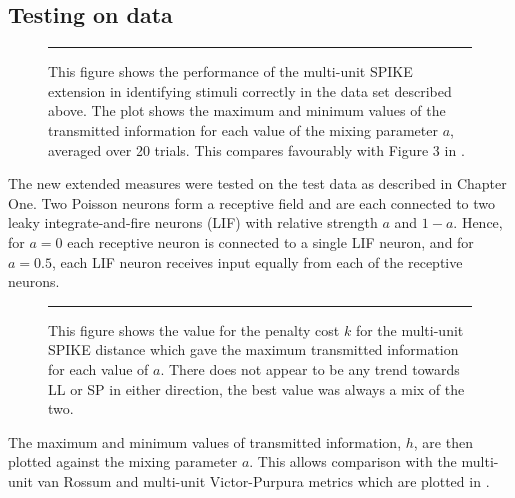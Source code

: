  \subsection{Testing on data}
% 
%

\begin{figure}[htb]

\bigskip
\rule{33em}{0.5pt}
\caption{This figure shows the performance of the multi-unit SPIKE extension in identifying stimuli correctly in the data set described above.  The plot shows the maximum and minimum values of the transmitted information for each value of the mixing parameter $a$, averaged over 20 trials. This compares favourably with Figure 3 in \citep{HoughtonSen2008a}.}
\end{figure}

 The new extended measures were tested on the \citep{HoughtonSen2008a} test data as described in Chapter One. Two Poisson neurons form a receptive field and are each connected to two leaky integrate-and-fire neurons (LIF) with relative strength $a$ and $1-a$.  Hence, for $a=0$ each receptive neuron is connected to a single LIF neuron, and for $a=0.5$, each LIF neuron receives input equally from each of the receptive neurons.
 
  \begin{figure}[htb]

\bigskip
\rule{33em}{0.5pt}
\caption{This figure shows the value for the penalty cost $k$ for the multi-unit SPIKE distance which gave the maximum transmitted information for each value of $a$.  There does not appear to be any trend towards LL or SP in either direction, the best value was always a mix of the two.}
\end{figure}

The maximum and minimum values of transmitted information, $h$, are then plotted against the mixing parameter $a$.  This allows comparison with the multi-unit van Rossum and multi-unit Victor-Purpura metrics which are plotted in \citep{HoughtonSen2008a}.
 
